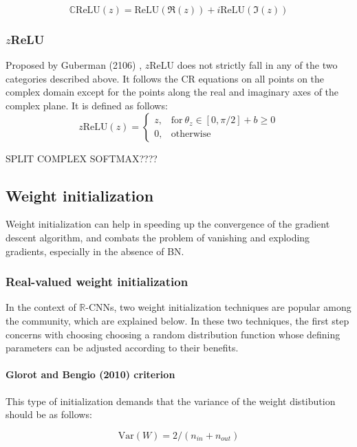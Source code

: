 \begin{equation}
\label{eqcrelu}
\mathbb{C}\mathrm{ReLU}(z) = \mathrm{ReLU}(\Re(z))+i\mathrm{ReLU}(\Im(z))
\end{equation}

 
 
 \subsubsection{$z$ReLU}
 Proposed by Guberman (2106) \cite{Guberman}, $z$ReLU does not strictly fall in any of the two categories described above. It follows the CR equations on all points on the complex domain except for the points along the real and imaginary axes of the complex plane. It is defined as follows:
  \begin{equation}
  \label{eqzrelu}
 z\mathrm{ReLU}(z) 
 {}=\begin{cases} z , &\mathrm{for} \ \theta_{z} \in [0,\pi/2] + b\ge 0 \\ 0 , &\textrm{otherwise} \end{cases}
 \end{equation}

SPLIT COMPLEX SOFTMAX????

 \subsection{Weight initialization}
 Weight initialization can help in speeding up the convergence of the gradient descent algorithm, and combats the problem of vanishing and exploding gradients, especially in the absence of BN. 
 
 
 \subsubsection{Real-valued weight initialization}\label{rvwi}
 In the context of $\mathbb{R}$-CNNs, two weight initialization techniques are popular among the community, which are explained below. In these two techniques, the first step concerns with choosing choosing a random distribution function whose defining parameters can be adjusted according to their benefits.
 \paragraph{Glorot and Bengio (2010) criterion}
 This type of initialization demands that the variance of the weight distibution should be as follows:

  \begin{equation}\label{gbwi}
\mathrm{Var}(W) = 2/(n_{in}+n_{out})
\end{equation}
 
